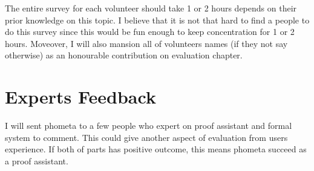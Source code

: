 \documentclass[master.tex]{subfiles}
\begin{document}
The entire survey for each volunteer should take 1 or 2 hours depends on their prior knowledge on this topic. I believe that it is not that hard to find a people to do this survey since this would be fun enough to keep concentration for 1 or 2 hours. Moveover, I will also mansion all of volunteers names (if they not say otherwise) as an honourable contribution on evaluation chapter.

\section{Experts Feedback}

I will sent phometa to a few people who expert on proof assistant and formal system to comment. This could give another aspect of evaluation from users experience. If both of parts has positive outcome, this means phometa succeed as a proof assistant.
\end{document}
